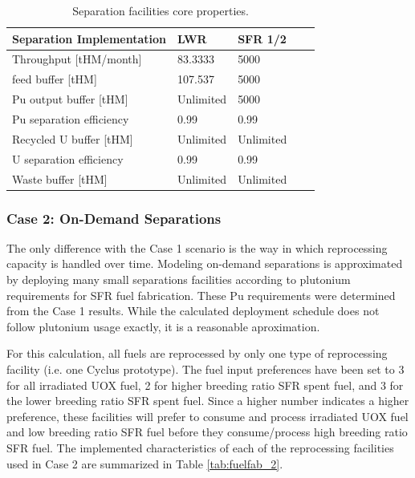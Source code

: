 \documentclass[12pt]{article}
\begin{document}
\begin{table}[h!]
    \centering
    \begin{tabular}{lllll}
    \hline
    Separation Implementation  &  LWR        &  SFR 1/2    \\
    \hline
    Throughput [tHM/month]     &  83.3333    &  5000       \\
    feed buffer [tHM]          &  107.537    &  5000       \\
    Pu output buffer [tHM]     &  Unlimited  &  5000       \\
    Pu separation efficiency   &  0.99       &  0.99       \\
    Recycled U buffer [tHM]    &  Unlimited  &  Unlimited  \\
    U separation efficiency    &  0.99       &  0.99       \\
    Waste buffer [tHM]         &  Unlimited  &  Unlimited  \\
    \hline
    \end{tabular}
    \caption{Separation facilities core properties. }
    \label{tab:separation_1}
\end{table}

\subsubsection{Case 2: On-Demand Separations}
\label{sec:case2}

The only difference with the Case 1 scenario is the way in which reprocessing
capacity is handled over time.  Modeling on-demand separations is approximated by
deploying many small separations facilities according to plutonium requirements
for SFR fuel fabrication.  These Pu requirements were determined from the Case 1
results. While the calculated deployment schedule does not follow plutonium usage
exactly, it is a reasonable aproximation.

For this calculation, all fuels are reprocessed by only one type of reprocessing
facility (i.e. one Cyclus prototype). The fuel input preferences have been set to
3 for all irradiated UOX fuel, 2 for higher breeding ratio SFR spent fuel, and 3
for the lower breeding ratio SFR spent fuel.  Since a higher number indicates a
higher preference, these facilities will prefer to consume and process irradiated
UOX fuel and low breeding ratio SFR fuel before they consume/process high breeding
ratio SFR fuel.  The implemented characteristics of each of the reprocessing
facilities used in Case 2 are summarized in Table
\ref{tab:fuelfab_2}.
\end{document}
